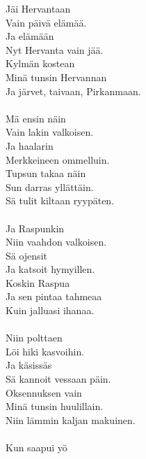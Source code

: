 
            Jäi Hervantaan \\
            Vain päivä elämää. \\
            Ja elämään \\
            Nyt Hervanta vain jää. \\
            Kylmän kostean \\
            Minä tunsin Hervannan \\
            Ja järvet, taivaan, Pirkanmaan. \\
\hspace{10mm} \\
            Mä ensin näin \\
            Vain lakin valkoisen. \\
            Ja haalarin \\
            Merkkeineen ommelluin. \\
            Tupsun takaa näin \\
            Sun darras yllättäin. \\
            Sä tulit kiltaan ryypäten. \\
\hspace{10mm} \\
            Ja Raspunkin \\
            Niin vaahdon valkoisen. \\
            Sä ojensit \\
            Ja katsoit hymyillen. \\
            Koskin Raspua \\
            Ja sen pintaa tahmeaa \\
            Kuin jalluasi ihanaa. \\
\hspace{10mm} \\
            Niin polttaen \\
            Löi hiki kasvoihin. \\
            Ja käsissäs \\
            Sä kannoit vessaan päin. \\
            Oksennuksen vain \\
            Minä tunsin huulillain. \\
            Niin lämmin kaljan makuinen. \\
\hspace{10mm} \\
            Kun saapui yö \\
